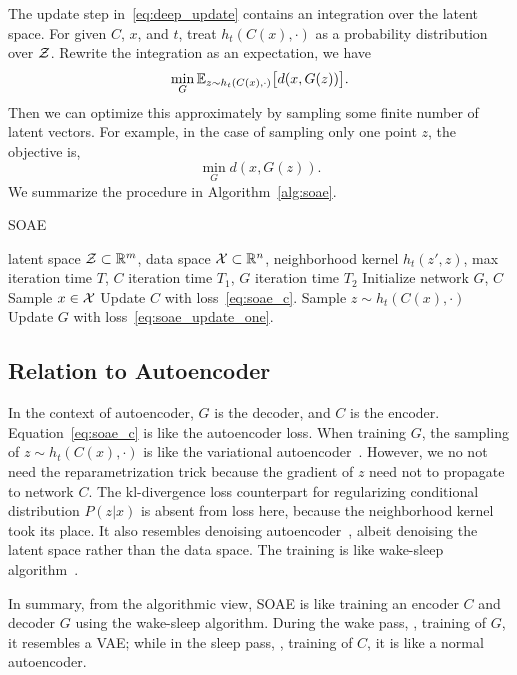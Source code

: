 The update step in~\eqref{eq:deep_update} contains an integration over the latent space.
For given \(C\), \(x\), and \(t\),
treat \(h_t(C(x), \cdot)\) as a probability distribution over \(\mathcal{Z}\).
Rewrite the integration as an expectation,
we have
\begin{equation}\label{eq:soae_update}
    \min_G \mathbb{E}_{z\sim h_t(C(x), \cdot)}\big[d(x, G(z))\big].
\end{equation}
Then we can optimize this approximately by sampling some finite number of latent vectors.
For example,
in the case of sampling only one point \(z\),
the objective is,
\begin{equation}\label{eq:soae_update_one}
    \min_G d(x, G(z)).
\end{equation}
We summarize the procedure in Algorithm~\ref{alg:soae}.

\begin{algorithm}[tb]
    \caption{SOAE}\label{alg:soae}
 \begin{algorithmic}
        latent space \(\mathcal{Z}\subset{\mathbb{R}}^m\),
        data space \(\mathcal{X}\subset{\mathbb{R}}^n\),
        neighborhood kernel \(h_t(z',z)\),
        max iteration time \(T\),
        \(C\) iteration time \(T_1\),
        \(G\) iteration time \(T_2\)
    \STATE
    \STATE Initialize network \(G\), \(C\)
        \STATE Sample \(x\in\mathcal{X}\)
        \STATE Update \(C\) with loss~\eqref{eq:soae_c}.
    \ENDFOR
        \STATE Sample \(z\sim h_t(C(x), \cdot)\)
        \STATE Update \(G\) with loss~\eqref{eq:soae_update_one}.
    \ENDFOR
    \ENDFOR
\end{algorithmic}
\end{algorithm}

\subsection{Relation to Autoencoder}

In the context of autoencoder,
\(G\) is the decoder,
and \(C\) is the encoder.
Equation~\eqref{eq:soae_c} is like the autoencoder loss.
When training \(G\),
the sampling of \(z\sim h_t(C(x), \cdot)\) is like the variational autoencoder~\cite{kingma2013auto}.
However,
we no not need the reparametrization trick because the gradient of \(z\) need not to propagate to network \(C\).
The kl-divergence loss counterpart for regularizing conditional distribution \(P(z|x)\) is absent from loss here,
because the neighborhood kernel took its place.
It also resembles denoising autoencoder~\cite{vincent2008extracting},
albeit denoising the latent space rather than the data space.
The training is like wake-sleep algorithm~\cite{hinton1995wake}.

In summary,
from the algorithmic view,
SOAE is like training an encoder \(C\) and decoder \(G\) using the wake-sleep algorithm.
During the wake pass, \ie, training of \(G\),
it resembles a VAE\@;
while in the sleep pass, \ie, training of \(C\),
it is like a normal autoencoder.
